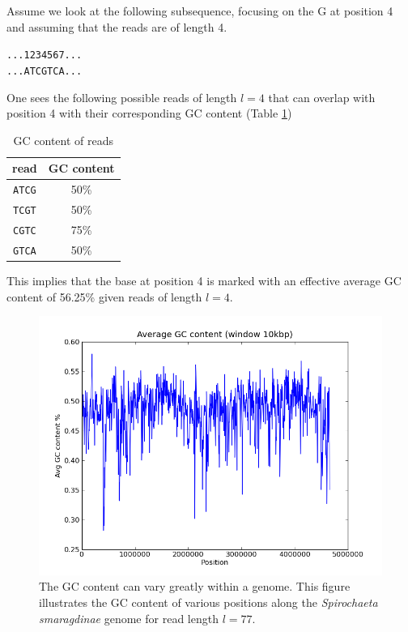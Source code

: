 \documentclass[phd,tocprelim]{cornell}
\begin{document}
Assume we look at the following subsequence, focusing on the G at position 4 and assuming that the reads are of length 4.

\singlespacing
\begin{center}
\texttt{...1234567...\\
...ATCGTCA...}
\end{center}
\normalspacing

One sees the following possible reads of length $l=4$ that can overlap with position 4 with their corresponding GC content (Table \ref{GCcontTable})

\pagebreak

\begin{table}[h]
    \label{GCcontTable}
    \caption{GC content of reads}
\begin{center}
\begin{tabular}{c|c}
    read & GC content \\
    \hline
    \texttt{ATCG} & 50\% \\
    \texttt{TCGT} & 50\% \\
    \texttt{CGTC} & 75\% \\
    \texttt{GTCA} & 50\%
\end{tabular}
\end{center}
\end{table}

This implies that the base at position 4 is marked with an effective average GC content of 56.25\% given reads of length $l=4$.

\begin{figure}[hptb]
    \centerline{\includegraphics[width=\textwidth]{figures/ALE/spiroGC.png}}
    \caption[GC content of {\it Spirochaeta smaragdinae}]{The GC content can vary greatly within a genome. This figure illustrates the GC content of various positions along the {\it Spirochaeta smaragdinae} genome for read length $l=77$.}\label{fig:GC2}
\end{figure}
\end{document}
